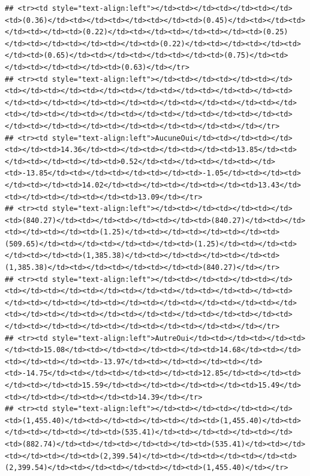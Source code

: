 \documentclass[
]{article}
\begin{document}
\begin{verbatim}
## <tr><td style="text-align:left"></td><td></td><td></td><td></td><td>(0.36)</td><td></td><td></td><td></td><td>(0.45)</td><td></td><td></td><td></td><td>(0.22)</td><td></td><td></td><td></td><td>(0.25)</td><td></td><td></td><td></td><td>(0.22)</td><td></td><td></td><td></td><td>(0.65)</td><td></td><td></td><td></td><td>(0.75)</td><td></td><td></td><td></td><td>(0.63)</td></tr>
## <tr><td style="text-align:left"></td><td></td><td></td><td></td><td></td><td></td><td></td><td></td><td></td><td></td><td></td><td></td><td></td><td></td><td></td><td></td><td></td><td></td><td></td><td></td><td></td><td></td><td></td><td></td><td></td><td></td><td></td><td></td><td></td><td></td><td></td><td></td><td></td></tr>
## <tr><td style="text-align:left">AucuneOui</td><td></td><td></td><td></td><td>14.36</td><td></td><td></td><td></td><td>13.85</td><td></td><td></td><td></td><td>0.52</td><td></td><td></td><td></td><td>-13.85</td><td></td><td></td><td></td><td>-1.05</td><td></td><td></td><td></td><td>14.02</td><td></td><td></td><td></td><td>13.43</td><td></td><td></td><td></td><td>13.09</td></tr>
## <tr><td style="text-align:left"></td><td></td><td></td><td></td><td>(840.27)</td><td></td><td></td><td></td><td>(840.27)</td><td></td><td></td><td></td><td>(1.25)</td><td></td><td></td><td></td><td>(509.65)</td><td></td><td></td><td></td><td>(1.25)</td><td></td><td></td><td></td><td>(1,385.38)</td><td></td><td></td><td></td><td>(1,385.38)</td><td></td><td></td><td></td><td>(840.27)</td></tr>
## <tr><td style="text-align:left"></td><td></td><td></td><td></td><td></td><td></td><td></td><td></td><td></td><td></td><td></td><td></td><td></td><td></td><td></td><td></td><td></td><td></td><td></td><td></td><td></td><td></td><td></td><td></td><td></td><td></td><td></td><td></td><td></td><td></td><td></td><td></td><td></td></tr>
## <tr><td style="text-align:left">AutreOui</td><td></td><td></td><td></td><td>15.08</td><td></td><td></td><td></td><td>14.68</td><td></td><td></td><td></td><td>-13.97</td><td></td><td></td><td></td><td>-14.75</td><td></td><td></td><td></td><td>12.85</td><td></td><td></td><td></td><td>15.59</td><td></td><td></td><td></td><td>15.49</td><td></td><td></td><td></td><td>14.39</td></tr>
## <tr><td style="text-align:left"></td><td></td><td></td><td></td><td>(1,455.40)</td><td></td><td></td><td></td><td>(1,455.40)</td><td></td><td></td><td></td><td>(535.41)</td><td></td><td></td><td></td><td>(882.74)</td><td></td><td></td><td></td><td>(535.41)</td><td></td><td></td><td></td><td>(2,399.54)</td><td></td><td></td><td></td><td>(2,399.54)</td><td></td><td></td><td></td><td>(1,455.40)</td></tr>

\end{verbatim}
\end{document}
